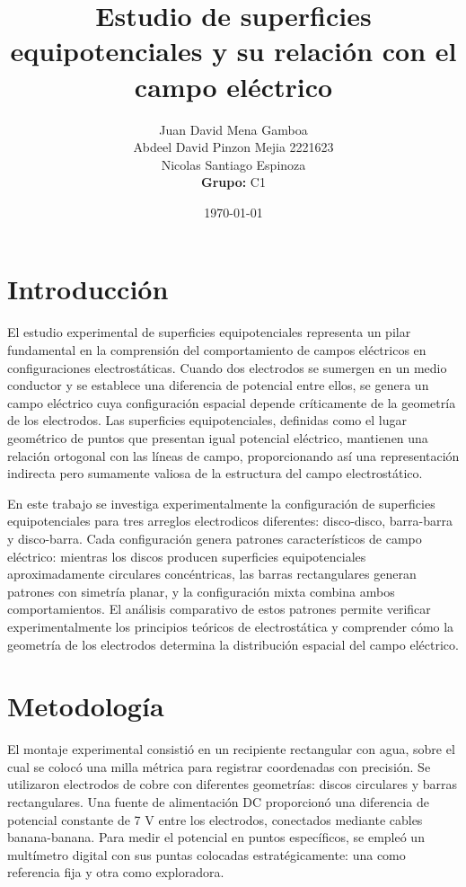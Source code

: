 \documentclass[11pt,twocolumn]{article}
\title{\textbf{Estudio de superficies equipotenciales y su relación con el campo eléctrico}}
\author{%
  Juan David Mena Gamboa\\
  Abdeel David Pinzon Mejia 2221623                   \\
  Nicolas Santiago Espinoza                   \\
  \textbf{Grupo:} C1
}
\date{\today}
\begin{document}
\maketitle
\thispagestyle{fancy}

\section{Introducción}
El estudio experimental de superficies equipotenciales representa un pilar fundamental en la comprensión del comportamiento de campos eléctricos en configuraciones electrostáticas. Cuando dos electrodos se sumergen en un medio conductor y se establece una diferencia de potencial entre ellos, se genera un campo eléctrico cuya configuración espacial depende críticamente de la geometría de los electrodos. Las superficies equipotenciales, definidas como el lugar geométrico de puntos que presentan igual potencial eléctrico, mantienen una relación ortogonal con las líneas de campo, proporcionando así una representación indirecta pero sumamente valiosa de la estructura del campo electrostático.

En este trabajo se investiga experimentalmente la configuración de superficies equipotenciales para tres arreglos electrodicos diferentes: disco-disco, barra-barra y disco-barra. Cada configuración genera patrones característicos de campo eléctrico: mientras los discos producen superficies equipotenciales aproximadamente circulares concéntricas, las barras rectangulares generan patrones con simetría planar, y la configuración mixta combina ambos comportamientos. El análisis comparativo de estos patrones permite verificar experimentalmente los principios teóricos de electrostática y comprender cómo la geometría de los electrodos determina la distribución espacial del campo eléctrico.

\section{Metodología}
El montaje experimental consistió en un recipiente rectangular con agua, sobre el cual se colocó una milla métrica para registrar coordenadas con precisión. Se utilizaron electrodos de cobre con diferentes geometrías: discos circulares y barras rectangulares. Una fuente de alimentación DC proporcionó una diferencia de potencial constante de 7 V entre los electrodos, conectados mediante cables banana-banana. Para medir el potencial en puntos específicos, se empleó un multímetro digital con sus puntas colocadas estratégicamente: una como referencia fija y otra como exploradora.
\end{document}
